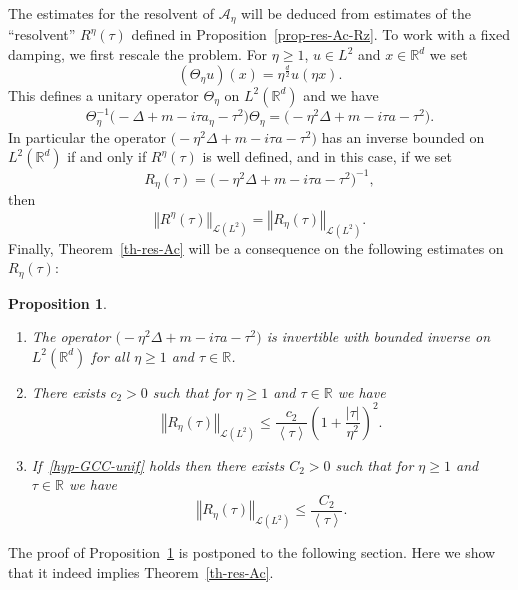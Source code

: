 \documentclass[11pt]{article}
\newtheorem{prop}[theo]{Proposition}
\theoremstyle{definition}
\newcommand{\pointir}{.\ ---\ }
\numberwithin{equation}{section}
\numberwithin{figure}{section}
\numberwithin{table}{section}
\newcommand{\abs}[1]{\left\vert #1\right\vert}
\newcommand{\nr}[1]{\left\Vert #1\right\Vert}
\newcommand{\pppg}[1] {\left< #1 \right>}
\renewcommand{\leq}{\leqslant}
\renewcommand{\geq}{\geqslant}
\newcommand{\inv}{^{-1}}
\newcommand{\1}{\mathds 1}
\newcommand{\R}{\mathbb{R}}
\newcommand{\D}{\Delta}
\newcommand{\Th}{\Theta}
\renewcommand{\t}{\tau}
\newcommand{\Ac}{{\mathcal A}}
\newcommand{\Lc}{{\mathcal L}}
\begin{document}
The estimates for the resolvent of $\Ac_\eta$ will be deduced from estimates of the ``resolvent'' $R^\eta(\t)$ defined in Proposition~\ref{prop-res-Ac-Rz}. To work with a fixed damping, we first rescale the problem. For $\eta \geq 1$, $u \in L^2$ and $x \in \R^d$ we set
\[
(\Th_\eta u)(x) = \eta^{\frac d 2} u(\eta x).
\]
This defines a unitary operator $\Th_\eta$ on $L^2(\R^d)$ and we have
\[
\Th_\eta\inv \big(-\D + m -i \t a_\eta - \t^2\big) \Th_\eta = \big(-\eta^2 \D + m -i \t a - \t^2\big).
\]
In particular the operator $\big(-\eta^2 \D + m -i \t a - \t^2\big)$ has an inverse bounded on $L^2(\R^d)$ if and only if $R^\eta(\t)$ is well defined, and in this case, if we set
\begin{equation}\label{def-Reta}
R_\eta(\t) = \big(-\eta^2 \D + m -i \t a - \t^2\big)\inv,
\end{equation}
then
\begin{equation}\label{eq-norm-res-eta}
\nr{R^\eta(\t)}_{\Lc(L^2)} = \nr{R_\eta(\t)}_{\Lc(L^2)}.
\end{equation}
Finally, Theorem~\ref{th-res-Ac} will be a consequence on the following estimates on $R_\eta(\t)$:

\let\oldpointir\pointir
\renewcommand*{\pointir}{}
\begin{prop}\label{prop-res-eta}\ 
\begin{enumerate}%
\item The operator ${\big(-\eta^2 \D + m -i \t a - \t^2\big)}$ is invertible with bounded inverse on $L^2(\R^d)$ for all $\eta \geq 1$ and $\t \in \R$.
\item There exists $c_2 > 0$ such that for $\eta \geq 1$ and $\t \in \R$ we have
\[
\nr{R_\eta(\t)}_{\Lc(L^2)} \leq \frac {c_2}{\pppg \tau} \left(1 + \frac {\abs \t} {\eta^2} \right)^2.
\]
\item If~\eqref{hyp-GCC-unif} holds then there exists $C_2 > 0$ such that for $\eta \geq 1$ and $\t \in \R$ we have
\[
\nr{R_\eta(\t)}_{\Lc(L^2)} \leq \frac {C_2} {\pppg \t}.
\]
\end{enumerate}
\end{prop}
\let\pointir\oldpointir

The proof of Proposition~\ref{prop-res-eta} is postponed to the following section. Here we show that it indeed implies Theorem~\ref{th-res-Ac}.
\end{document}
